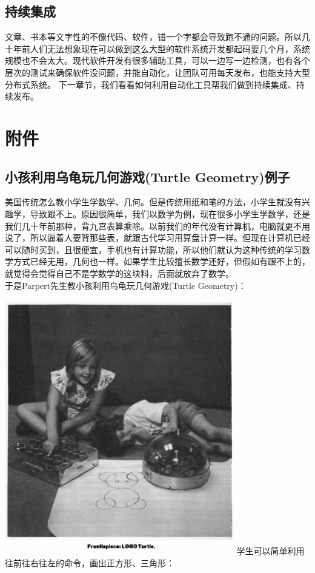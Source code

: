 \hypertarget{ux6301ux7eedux96c6ux6210}{%
\subsection{持续集成}\label{ux6301ux7eedux96c6ux6210}}

文章、书本等文字性的不像代码、软件，错一个字都会导致跑不通的问题。所以几十年前人们无法想象现在可以做到这么大型的软件系统开发都起码要几个月，系统规模也不会太大。现代软件开发有很多辅助工具，可以一边写一边检测，也有各个层次的测试来确保软件没问题，并能自动化，让团队可用每天发布，也能支持大型分布式系统。
下一章节，我们看看如何利用自动化工具帮我们做到持续集成、持续发布。

\hypertarget{ux9644ux4ef6}{%
\section{附件}\label{ux9644ux4ef6}}

\hypertarget{a1-ux5c0fux5b69ux5229ux7528ux4e4cux9f9fux73a9ux51e0ux4f55ux6e38ux620fturtle-geometryux4f8bux5b50}{%
\subsection{小孩利用乌龟玩几何游戏(Turtle
Geometry)例子}\label{a1-ux5c0fux5b69ux5229ux7528ux4e4cux9f9fux73a9ux51e0ux4f55ux6e38ux620fturtle-geometryux4f8bux5b50}}

美国传统怎么教小学生学数学、几何。但是传统用纸和笔的方法，小学生就没有兴趣学，导致跟不上。原因很简单，我们以数学为例，现在很多小学生学数学，还是我们几十年前那种，背九宫表算乘除。以前我们的年代没有计算机，电脑就更不用说了，所以逼着人要背那些表，就跟古代学习用算盘计算一样。但现在计算机已经可以随时买到，且很便宜，手机也有计算功能，所以他们就认为这种传统的学习数学方式已经无用，几何也一样。如果学生比较擅长数学还好，但假如有跟不上的，就觉得会觉得自己不是学数学的这块料，后面就放弃了数学。\\
于是Parpert先生教小孩利用乌龟玩几何游戏(Turtle Geometry)：


\includegraphics[width=10cm]{mindstorm_p5.jpg}
学生可以简单利用往前往右往左的命令，画出正方形、三角形：

